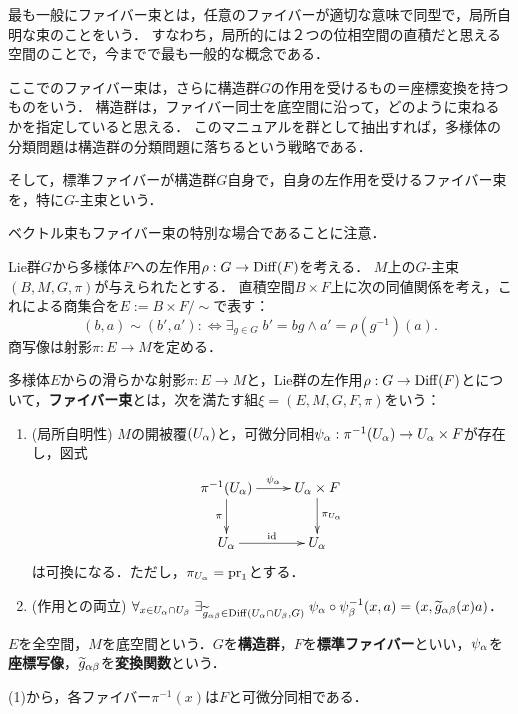 \documentclass[uplatex,dvipdfmx]{jsreport}
\begin{document}
\begin{tcolorbox}[colframe=ForestGreen, colback=ForestGreen!10!white,breakable,colbacktitle=ForestGreen!40!white,coltitle=black,fonttitle=\bfseries\sffamily,
title=]
    最も一般にファイバー束とは，任意のファイバーが適切な意味で同型で，局所自明な束のことをいう．
    すなわち，局所的には２つの位相空間の直積だと思える空間のことで，今までで最も一般的な概念である．

    ここでのファイバー束は，さらに構造群$G$の作用を受けるもの＝座標変換を持つものをいう．
    構造群は，ファイバー同士を底空間に沿って，どのように束ねるかを指定していると思える．
    このマニュアルを群として抽出すれば，多様体の分類問題は構造群の分類問題に落ちるという戦略である．

    そして，標準ファイバーが構造群$G$自身で，自身の左作用を受けるファイバー束を，特に$G$-主束という．

    ベクトル束もファイバー束の特別な場合であることに注意．
\end{tcolorbox}

\begin{discussion}
    Lie群$G$から多様体$F$への左作用$\rho:G\to\mathrm{Diff}(F)$を考える．
    $M$上の$G$-主束$(B,M,G,\pi)$が与えられたとする．
    直積空間$B\times F$上に次の同値関係を考え，これによる商集合を$E:=B\times F/\sim$で表す：
    \[(b,a)\sim(b',a'):\Leftrightarrow\exists_{g\in G}\;b'=bg\land a'=\rho(g^{-1})(a).\]
    商写像は射影$\pi:E\to M$を定める．
\end{discussion}

\begin{definition}
    多様体$E$からの滑らかな射影$\pi:E\to M$と，Lie群の左作用$\rho:G\to\mathrm{Diff}(F)$とについて，\textbf{ファイバー束}とは，次を満たす組$\xi=(E,M,G,F,\pi)$をいう：
    \begin{enumerate}
        \item (局所自明性) $M$の開被覆$(U_\alpha)$と，可微分同相$\psi_\alpha:\pi^{-1}(U_\alpha)\to U_\alpha\times F$が存在し，図式
        \[\xymatrix{
            \pi^{-1}(U_\al)\ar[r]^-{\psi_\al}\ar[d]_-\pi&U_\al\times F\ar[d]^-{\pi_{U_\al}}\\
            U_\al\ar[r]^-{\id}&U_\al
        }\]
        は可換になる．ただし，$\pi_{U_\alpha}=\mathrm{pr}_1$とする．
        \item (作用との両立) $\forall_{x\in U_\alpha\cap U_\beta}\;\exists_{\widetilde{g}_{\alpha\beta}\in\mathrm{Diff}(U_\alpha\cap U_\beta,G)}\;\psi_\alpha\circ\psi_\beta^{-1}(x,a)=(x,\widetilde{g}_{\alpha\beta}(x)a)$．
    \end{enumerate}
    $E$を全空間，$M$を底空間という．$G$を\textbf{構造群}，$F$を\textbf{標準ファイバー}といい，$\psi_\alpha$を\textbf{座標写像}，$\widetilde{g}_{\alpha\beta}$を\textbf{変換関数}という．
\end{definition}
\begin{remarks}
    (1)から，各ファイバー$\pi^{-1}(x)$は$F$と可微分同相である．
\end{remarks}
\end{document}
